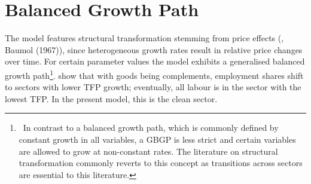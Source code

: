\section{Balanced Growth Path}

The model features structural transformation stemming from price effects (\cite{Ngai2007StructuralGrowth}, Baumol (1967)), since heterogeneous growth rates result in relative price changes over time. %
For certain parameter values the model exhibits a generalised balanced growth path\footnote{\ 
In contrast to a balanced growth path, which is commonly defined by constant growth in all variables, a GBGP is less strict and certain variables are allowed to grow at non-constant rates. The literature on structural transformation commonly reverts to this concept as transitions across sectors are essential to this literature.}.
\cite{Ngai2007StructuralGrowth} show that with goods being complements, employment shares shift to sectors with lower TFP growth; eventually, all labour is in the sector with the lowest TFP. In the present model, this is the clean sector. 

